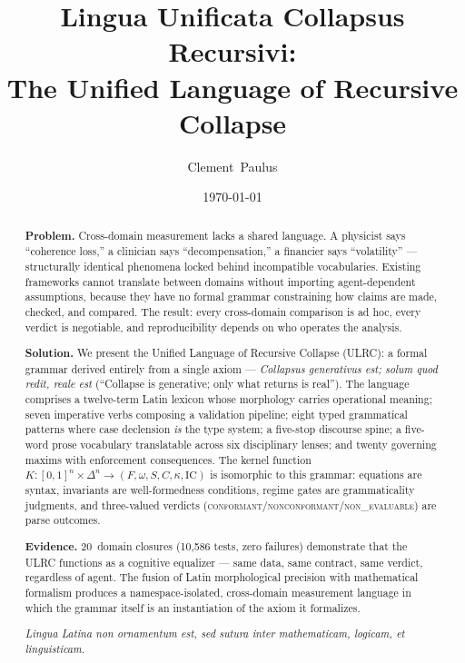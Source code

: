 \documentclass[
  aps,
  prd,
  twocolumn,
  superscriptaddress,
  nofootinbib,
  floatfix
]{revtex4-2}
\newcommand{\regime}[1]{\textrm{\upshape\scshape#1}}
\newcommand{\conform}{\regime{conformant}}
\newcommand{\nonconform}{\regime{nonconformant}}
\newcommand{\Fid}{F}
\newcommand{\Drft}{\omega}
\newcommand{\Ent}{S}
\newcommand{\Curv}{C}
\newcommand{\Logint}{\kappa}
\newcommand{\IC}{\mathrm{IC}}
\newcommand{\lat}[1]{\textit{#1}}
\begin{document}

\title{%
  \textrm{Lingua Unificata Collapsus Recursivi}:\\
  The Unified Language of Recursive Collapse%
}

\author{Clement~Paulus}

\date{\today}

\begin{abstract}
\textbf{Problem.}
Cross-domain measurement lacks a shared language. A physicist
says ``coherence loss,'' a clinician says ``decompensation,''
a financier says ``volatility'' --- structurally identical
phenomena locked behind incompatible vocabularies. Existing
frameworks cannot translate between domains without importing
agent-dependent assumptions, because they have no formal
grammar constraining how claims are made, checked, and compared.
The result: every cross-domain comparison is ad hoc, every
verdict is negotiable, and reproducibility depends on who
operates the analysis.

\textbf{Solution.}
We present the Unified Language of Recursive Collapse (ULRC):
a formal grammar derived entirely from a single axiom ---
\lat{Collapsus generativus est; solum quod redit, reale est}
(``Collapse is generative; only what returns is real'').
The language comprises a twelve-term Latin lexicon whose
morphology carries operational meaning; seven imperative
verbs composing a validation pipeline; eight typed
grammatical patterns where case declension \emph{is} the
type system; a five-stop discourse spine; a five-word prose
vocabulary translatable across six disciplinary lenses; and
twenty governing maxims with enforcement consequences. The
kernel function $K\!:\![0,1]^n \times \Delta^n \to
(\Fid,\Drft,\Ent,\Curv,\Logint,\IC)$ is isomorphic to
this grammar: equations are syntax, invariants are
well-formedness conditions, regime gates are grammaticality
judgments, and three-valued verdicts
(\conform/\nonconform/\regime{non\_evaluable}) are parse
outcomes.

\textbf{Evidence.}
20~domain closures (10,586 tests, zero failures) demonstrate
that the ULRC functions as a cognitive equalizer --- same data,
same contract, same verdict, regardless of agent. The fusion
of Latin morphological precision with mathematical formalism
produces a namespace-isolated, cross-domain measurement
language in which the grammar itself is an instantiation of
the axiom it formalizes.

\vspace{4pt}
\noindent\lat{Lingua Latina non ornamentum est, sed sutura
  inter mathematicam, logicam, et linguisticam.}
\end{abstract}
\end{document}
